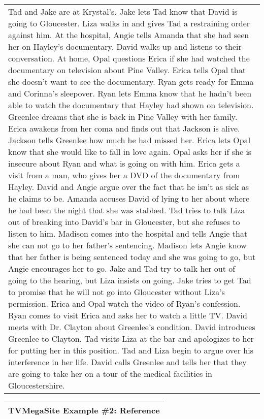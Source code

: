 \begin{table}[!htbp]
\begin{tabular}{p{\linewidth}}
Tad and Jake are at Krystal's. Jake lets Tad know that David is going to Gloucester. Liza walks in and gives Tad a restraining order against him. At the hospital, Angie tells Amanda that she had seen her on Hayley's documentary. David walks up and listens to their conversation. At home, Opal questions Erica if she had watched the documentary on television about Pine Valley. Erica tells Opal that she doesn't want to see the documentary. Ryan gets ready for Emma and Corinna's sleepover. Ryan lets Emma know that he hadn't been able to watch the documentary that Hayley had shown on television. Greenlee dreams that she is back in Pine Valley with her family. Erica awakens from her coma and finds out that Jackson is alive. Jackson tells Greenlee how much he had missed her. Erica lets Opal know that she would like to fall in love again. Opal asks her if she is insecure about Ryan and what is going on with him. Erica gets a visit from a man, who gives her a DVD of the documentary from Hayley. David and Angie argue over the fact that he isn't as sick as he claims to be. Amanda accuses David of lying to her about where he had been the night that she was stabbed. Tad tries to talk Liza out of breaking into David's bar in Gloucester, but she refuses to listen to him. Madison comes into the hospital and tells Angie that she can not go to her father's sentencing. Madison lets Angie know that her father is being sentenced today and she was going to go, but Angie encourages her to go. Jake and Tad try to talk her out of going to the hearing, but Liza insists on going. Jake tries to get Tad to promise that he will not go into Gloucester without Liza's permission. Erica and Opal watch the video of Ryan's confession. Ryan comes to visit Erica and asks her to watch a little TV. David meets with Dr. Clayton about Greenlee's condition. David introduces Greenlee to Clayton. Tad visits Liza at the bar and apologizes to her for putting her in this position. Tad and Liza begin to argue over his interference in her life. David calls Greenlee and tells her that they are going to take her on a tour of the medical facilities in Gloucestershire.
    \\
    \end{tabular}
    \begin{tabular}{p{\linewidth}} 
    \midrule
    \textbf{TVMegaSite Example \#2: Reference} \\
    \midrule

\end{tabular}
\end{table}
